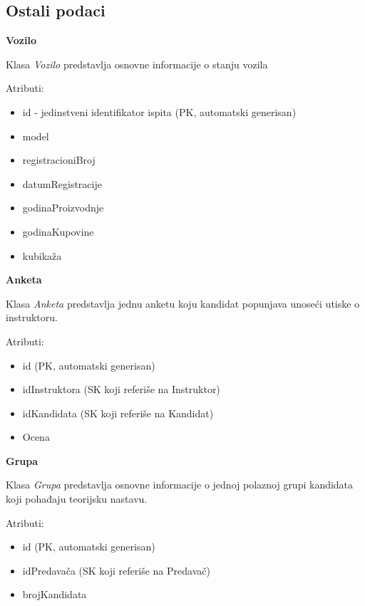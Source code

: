 \subsection{Ostali podaci}

\textbf{\large Vozilo}
\vspace{0.3cm}

Klasa \textit{Vozilo} predstavlja osnovne informacije o stanju vozila

Atributi:
\begin{itemize}
    \item id - jedinstveni identifikator ispita (PK, automatski generisan)
    \item model
    \item registracioniBroj
    \item datumRegistracije
    \item godinaProizvodnje
    \item godinaKupovine
    \item kubikaža
\end{itemize}

\textbf{\large Anketa}
\vspace{0.3cm}

Klasa \textit{Anketa} predstavlja jednu anketu koju kandidat popunjava unoseći utiske o instruktoru.

Atributi:
\begin{itemize}
    \item id (PK, automatski generisan)
    \item idInstruktora (SK koji referiše na Instruktor)
    \item idKandidata (SK koji referiše na Kandidat)
    \item Ocena
\end{itemize}

\textbf{\large Grupa}
\vspace{0.3cm}

Klasa \textit{Grupa} predstavlja osnovne informacije o jednoj polaznoj grupi kandidata koji pohađaju teorijsku nastavu.

Atributi:
\begin{itemize}
    \item id (PK, automatski generisan)
    \item idPredavača (SK koji referiše na Predavač)
    \item brojKandidata 
\end{itemize}

